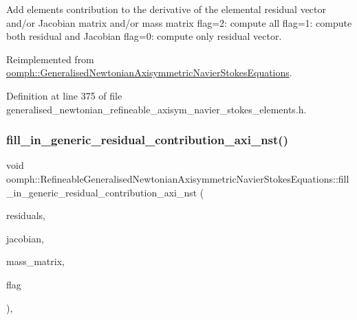 Add element\textquotesingle{}s contribution to the derivative of the elemental residual vector and/or Jacobian matrix and/or mass matrix flag=2\+: compute all flag=1\+: compute both residual and Jacobian flag=0\+: compute only residual vector. 



Reimplemented from \hyperlink{classoomph_1_1GeneralisedNewtonianAxisymmetricNavierStokesEquations_a162f23398b74cb7a99506c4f8f277811}{oomph\+::\+Generalised\+Newtonian\+Axisymmetric\+Navier\+Stokes\+Equations}.



Definition at line 375 of file generalised\+\_\+newtonian\+\_\+refineable\+\_\+axisym\+\_\+navier\+\_\+stokes\+\_\+elements.\+h.

\mbox{\label{classoomph_1_1RefineableGeneralisedNewtonianAxisymmetricNavierStokesEquations_a2db17023f544958a02c0c787da9020df}} 
\subsubsection{\texorpdfstring{fill\+\_\+in\+\_\+generic\+\_\+residual\+\_\+contribution\+\_\+axi\+\_\+nst()}{fill\_in\_generic\_residual\_contribution\_axi\_nst()}}
{\footnotesize\ttfamily void oomph\+::\+Refineable\+Generalised\+Newtonian\+Axisymmetric\+Navier\+Stokes\+Equations\+::fill\+\_\+in\+\_\+generic\+\_\+residual\+\_\+contribution\+\_\+axi\+\_\+nst (\begin{DoxyParamCaption}\item[{\hyperlink{classoomph_1_1Vector}{Vector}$<$ double $>$ \&}]{residuals,  }\item[{\hyperlink{classoomph_1_1DenseMatrix}{Dense\+Matrix}$<$ double $>$ \&}]{jacobian,  }\item[{\hyperlink{classoomph_1_1DenseMatrix}{Dense\+Matrix}$<$ double $>$ \&}]{mass\+\_\+matrix,  }\item[{unsigned}]{flag }\end{DoxyParamCaption})\hspace{0.3cm}{\ttfamily [private]}, {\ttfamily [virtual]}}



